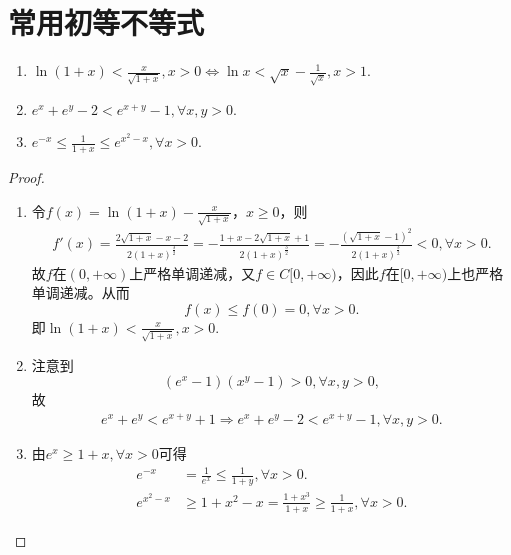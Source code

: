 \documentclass[../../main.tex]{subfiles}
\begin{document}
\section{常用初等不等式}

\begin{proposition}[常用不等式]\label{proposition:常用不等式}
\begin{enumerate}[(1)]
\item\label{proposition:常用不等式1} $\ln \left( 1+x \right) <\frac{x}{\sqrt{1+x}},x>0\iff \ln x<\sqrt{x}-\frac{1}{\sqrt{x}},x>1.$

\item \label{proposition:常用不等式3} $e^x+e^y-2<e^{x+y}-1,\forall x,y>0.$

\item \label{proposition:常用不等式4} $e^{-x}\leqslant \frac{1}{1+x}\leqslant e^{x^2-x},\forall x>0.$
\end{enumerate}
\end{proposition}
\begin{proof}
\begin{enumerate}[(1)]
\item 令\(f(x)=\ln(1 + x)-\frac{x}{\sqrt{1 + x}}\)，\(x\geqslant 0\)，则
\begin{align*}
f'\left( x \right) =\frac{2\sqrt{1+x}-x-2}{2\left( 1+x \right) ^{\frac{3}{2}}}=-\frac{1+x-2\sqrt{1+x}+1}{2\left( 1+x \right) ^{\frac{3}{2}}}=-\frac{\left( \sqrt{1+x}-1 \right) ^2}{2\left( 1+x \right) ^{\frac{3}{2}}}<0,\forall x>0.
\end{align*}
故\(f\)在\((0,+\infty)\)上严格单调递减，又\(f\in C[0,+\infty)\)，因此\(f\)在\([0,+\infty)\)上也严格单调递减。从而
\[
f(x)\leqslant f(0)=0,\forall x>0.
\]
即\(\ln(1 + x)<\frac{x}{\sqrt{1 + x}},x>0\).

\item 注意到
\[
(e^x-1)(x^y-1)>0,\forall x,y>0,
\]
故
\begin{align*}
e^x+e^y<e^{x+y}+1\Longrightarrow e^x+e^y-2<e^{x+y}-1,\forall x,y>0.
\end{align*}

\item 由$e^x\geqslant 1+x,\forall x>0$可得
\begin{align*}
e^{-x}&=\frac{1}{e^x}\leqslant \frac{1}{1+y},\forall x>0.
\\
e^{x^2-x}&\geqslant 1+x^2-x=\frac{1+x^3}{1+x}\geqslant \frac{1}{1+x},\forall x>0.
\end{align*}
\end{enumerate}
\end{proof}
\end{document}
